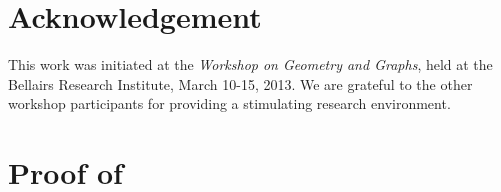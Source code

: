\documentclass{patmorin}
\renewcommand{\note}[1]{}
\begin{document}
\section*{Acknowledgement}

This work was initiated at the \emph{Workshop on Geometry and Graphs},
held at the Bellairs Research Institute, March 10-15, 2013.  We are
grateful to the other workshop participants for providing a stimulating
research environment.

\note{I checked the accents on Sari\"oz and P\'alv\"olgyi. They use \textbackslash" in their papers.}




\appendix

\section{Proof of }
\end{document}
